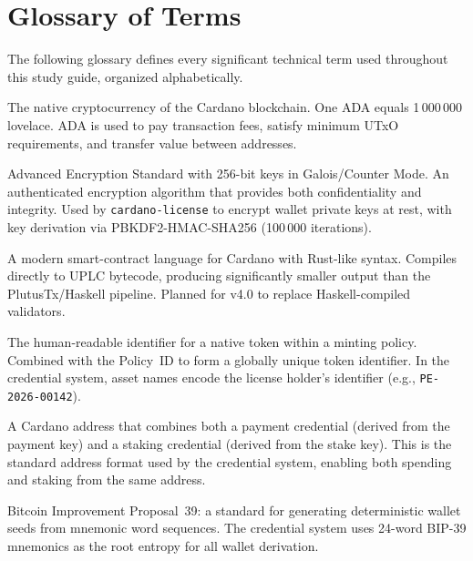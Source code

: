 \section{Glossary of Terms}
\label{sec:glossary}

The following glossary defines every significant technical term used
throughout this study guide, organized alphabetically.

\begin{description}[style=nextline, leftmargin=2.5cm, labelwidth=2.3cm]

\item[ADA]
  The native cryptocurrency of the Cardano blockchain.  One ADA equals
  1\,000\,000 lovelace.  ADA is used to pay transaction fees, satisfy
  minimum UTxO requirements, and transfer value between addresses.

\item[AES-256-GCM]
  Advanced Encryption Standard with 256-bit keys in Galois/Counter Mode.
  An authenticated encryption algorithm that provides both confidentiality
  and integrity.  Used by \texttt{cardano-license} to encrypt wallet private
  keys at rest, with key derivation via PBKDF2-HMAC-SHA256 (100\,000
  iterations).

\item[Aiken]
  A modern smart-contract language for Cardano with Rust-like syntax.
  Compiles directly to UPLC bytecode, producing significantly smaller output
  than the PlutusTx/Haskell pipeline.  Planned for v4.0 to replace
  Haskell-compiled validators.

\item[Asset Name]
  The human-readable identifier for a native token within a minting policy.
  Combined with the Policy~ID to form a globally unique token identifier.
  In the credential system, asset names encode the license holder's
  identifier (e.g., \texttt{PE-2026-00142}).

\item[Base Address]
  A Cardano address that combines both a payment credential (derived from
  the payment key) and a staking credential (derived from the stake key).
  This is the standard address format used by the credential system, enabling
  both spending and staking from the same address.

\item[BIP-39]
  Bitcoin Improvement Proposal~39: a standard for generating deterministic
  wallet seeds from mnemonic word sequences.  The credential system uses
  24-word BIP-39 mnemonics as the root entropy for all wallet derivation.


\end{description}
